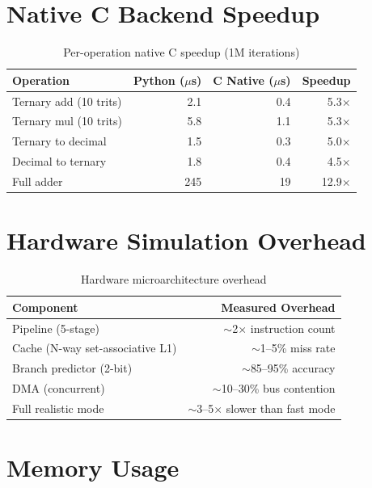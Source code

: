 \documentclass[12pt,a4paper,twoside]{book}
\theoremstyle{trinarytheorem}
\theoremstyle{trinarydefinition}
\begin{document}
\section{Native C Backend Speedup}

\begin{table}[H]
\centering
\caption{Per-operation native C speedup (1M iterations)}
\label{app:nativeperf}
\begin{tabular}{lrrr}
\toprule
Operation & Python ($\mu$s) & C Native ($\mu$s) & Speedup \\
\midrule
Ternary add (10 trits) & 2.1 & 0.4 & 5.3$\times$ \\
Ternary mul (10 trits) & 5.8 & 1.1 & 5.3$\times$ \\
Ternary to decimal & 1.5 & 0.3 & 5.0$\times$ \\
Decimal to ternary & 1.8 & 0.4 & 4.5$\times$ \\
Full adder & 245 & 19 & 12.9$\times$ \\
\bottomrule
\end{tabular}
\end{table}

\section{Hardware Simulation Overhead}

\begin{table}[H]
\centering
\caption{Hardware microarchitecture overhead}
\label{app:hwperf}
\begin{tabular}{lr}
\toprule
Component & Measured Overhead \\
\midrule
Pipeline (5-stage) & $\sim$2$\times$ instruction count \\
Cache (N-way set-associative L1) & $\sim$1--5\% miss rate \\
Branch predictor (2-bit) & $\sim$85--95\% accuracy \\
DMA (concurrent) & $\sim$10--30\% bus contention \\
Full realistic mode & $\sim$3--5$\times$ slower than fast mode \\
\bottomrule
\end{tabular}
\end{table}

\section{Memory Usage}
\end{document}
